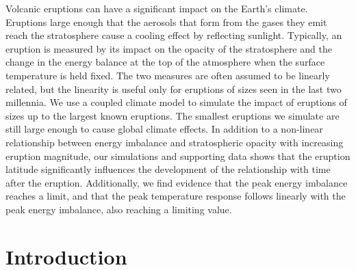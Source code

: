 \documentclass[draft]{agujournal2019}
\begin{document}
  Volcanic eruptions can have a significant impact on the Earth's climate. Eruptions
  large enough that  the aerosols that form from the gases they
  emit reach the stratosphere cause a cooling effect by reflecting sunlight. Typically,
  an eruption is measured by its impact on the opacity of the stratosphere and the
  change in the  energy balance at the top of the atmosphere when
  the surface temperature is held fixed. The two measures are often assumed to be
  linearly related, but the linearity is useful only for eruptions of sizes seen in the
  last two millennia. We use a coupled climate model to simulate the impact of eruptions
  of sizes up to the largest known eruptions. The smallest eruptions we simulate are
  still large enough to cause global climate effects. In addition to a non-linear
  relationship between energy imbalance and stratospheric opacity with increasing
  eruption magnitude, our simulations and supporting data shows that the eruption
  latitude significantly influences the development of the relationship with time after
  the eruption. Additionally, we find evidence that the peak energy imbalance reaches a
  limit, and that the peak temperature response follows linearly with the peak energy
  imbalance, also reaching a limiting value.


  \section{Introduction}

\end{document}
